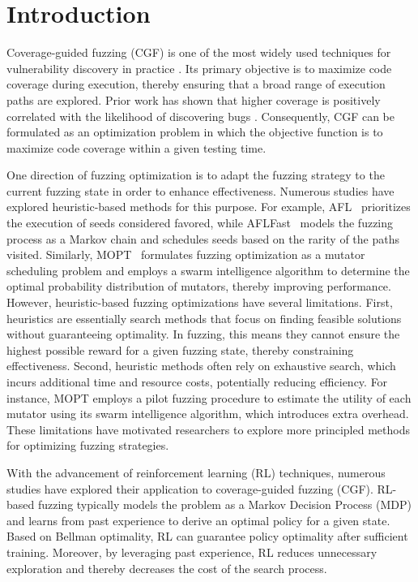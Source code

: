 \documentclass[lettersize,journal]{IEEEtran}
\begin{document}
\section{Introduction}

Coverage-guided fuzzing (CGF) is one of the most widely used techniques for vulnerability discovery in practice \cite{zhuFuzzingSurveyRoadmap2022,huangBalanceSeedScheduling2023,liDeepLearningCoverageguided2022,boehmeFuzzingChallengesReflections2021}. Its primary objective is to maximize code coverage during execution, thereby ensuring that a broad range of execution paths are explored. Prior work has shown that higher coverage is positively correlated with the likelihood of discovering bugs \cite{bohmeReliabilityCoveragebasedFuzzer2022}. Consequently, CGF can be formulated as an optimization problem in which the objective function is to maximize code coverage within a given testing time.

One direction of fuzzing optimization is to adapt the fuzzing strategy to the current fuzzing state in order to enhance effectiveness. Numerous studies have explored heuristic-based methods for this purpose. For example, AFL~\cite{AmericanFuzzyLop} prioritizes the execution of seeds considered favored, while AFLFast~\cite{bohmeCoveragebasedGreyboxFuzzing2019} models the fuzzing process as a Markov chain and schedules seeds based on the rarity of the paths visited. Similarly, MOPT~\cite{lyuMOPTOptimizedMutation2019} formulates fuzzing optimization as a mutator scheduling problem and employs a swarm intelligence algorithm to determine the optimal probability distribution of mutators, thereby improving performance. However, heuristic-based fuzzing optimizations have several limitations. First, heuristics are essentially search methods that focus on finding feasible solutions without guaranteeing optimality. In fuzzing, this means they cannot ensure the highest possible reward for a given fuzzing state, thereby constraining effectiveness. Second, heuristic methods often rely on exhaustive search, which incurs additional time and resource costs, potentially reducing efficiency. For instance, MOPT employs a pilot fuzzing procedure to estimate the utility of each mutator using its swarm intelligence algorithm, which introduces extra overhead. These limitations have motivated researchers to explore more principled methods for optimizing fuzzing strategies.

With the advancement of reinforcement learning (RL) techniques, numerous studies have explored their application to coverage-guided fuzzing (CGF). RL-based fuzzing typically models the problem as a Markov Decision Process (MDP) and learns from past experience to derive an optimal policy for a given state. Based on Bellman optimality, RL can guarantee policy optimality after sufficient training. Moreover, by leveraging past experience, RL reduces unnecessary exploration and thereby decreases the cost of the search process. 
\end{document}
